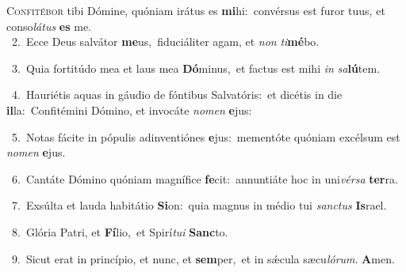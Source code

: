 \lettrine{\initial\textcolor{\initialcolor}{C}}{onfitébor} tibi Dómine, quóniam irátus es \textbf{mi}\-hi:~\star convérsus est furor tuus, et conso\-\textit{lá}\-\textit{tus} \textbf{es} me.\\
{\numbfont\textcolor{\numbcolor}{~2.}}~Ecce Deus salvátor \textbf{me}\-us,~\star fiduciáliter agam, et \textit{non} \textit{ti}\-\textbf{mé}bo.\par
{\numbfont\textcolor{\numbcolor}{~3.}}~Quia fortitúdo mea et laus mea \textbf{Dó}\-minus,~\star et factus est mihi \textit{in} \textit{sa}\-\textbf{lú}tem.\par
{\numbfont\textcolor{\numbcolor}{~4.}}~Hauriétis aquas in gáudio de fóntibus Salvatóris:~\dagger et dicétis in die \textbf{il}\-la:~\star Confitémini Dómino, et invocáte \textit{no}\-\textit{men} \textbf{e}\-jus:\par
{\numbfont\textcolor{\numbcolor}{~5.}}~Notas fácite in pópulis adinventiónes \textbf{e}\-jus:~\star mementóte quóniam excélsum est \textit{no}\-\textit{men} \textbf{e}\-jus.\par
{\numbfont\textcolor{\numbcolor}{~6.}}~Cantáte Dómino quóniam magnífice \textbf{fe}\-cit:~\star annuntiáte hoc in uni\-\textit{vér}\-\textit{sa} \textbf{ter}\-ra.\par
{\numbfont\textcolor{\numbcolor}{~7.}}~Exsúlta et lauda habitátio \textbf{Si}\-on:~\star quia magnus in médio tui \textit{sanc}\-\textit{tus} \textbf{Is}\-rael.\par
{\numbfont\textcolor{\numbcolor}{~8.}}~Glória Patri, et \textbf{Fí}\-lio,~\star et Spirí\-\textit{tu}\-\textit{i} \textbf{Sanc}\-to.\par
{\numbfont\textcolor{\numbcolor}{~9.}}~Sicut erat in princípio, et nunc, et \textbf{sem}\-per,~\star et in sǽcula sæcu\-\textit{ló}\-\textit{rum}. \textbf{A}\-men.\par

